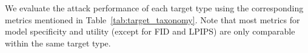 
We evaluate the attack performance of each target type using the corresponding metrics mentioned in Table~\ref{tab:target_taxonomy}. Note that most metrics for model specificity and utility (except for FID and LPIPS) are only comparable within the same target type.

